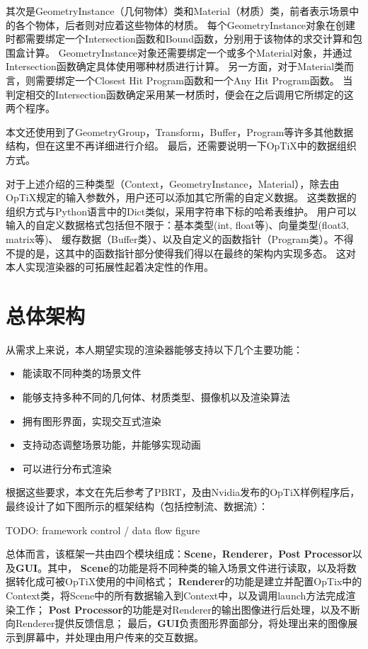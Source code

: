 其次是GeometryInstance（几何物体）类和Material（材质）类，前者表示场景中的各个物体，后者则对应着这些物体的材质。
每个GeometryInstance对象在创建时都需要绑定一个Intersection函数和Bound函数，分别用于该物体的求交计算和包围盒计算。
GeometryInstance对象还需要绑定一个或多个Material对象，并通过Intersection函数确定具体使用哪种材质进行计算。
另一方面，对于Material类而言，则需要绑定一个Closest Hit Program函数和一个Any Hit Program函数。
当判定相交的Intersection函数确定采用某一材质时，便会在之后调用它所绑定的这两个程序。

本文还使用到了GeometryGroup，Transform，Buffer，Program等许多其他数据结构，但在这里不再详细进行介绍。
最后，还需要说明一下OpTiX中的数据组织方式。

对于上述介绍的三种类型（Context，GeometryInstance，Material），除去由OpTiX规定的输入参数外，用户还可以添加其它所需的自定义数据。
这类数据的组织方式与Python语言中的Dict类似，采用字符串下标的哈希表维护。
用户可以输入的自定义数据格式包括但不限于：基本类型(int, float等)、向量类型(float3, matrix等)、
缓存数据（Buffer类）、以及自定义的函数指针（Program类）。不得不提的是，这其中的函数指针部分使得我们得以在最终的架构内实现多态。
这对本人实现渲染器的可拓展性起着决定性的作用。

\section{总体架构}
 
从需求上来说，本人期望实现的渲染器能够支持以下几个主要功能：

\begin{itemize}
    \item{能读取不同种类的场景文件}
    \item{能够支持多种不同的几何体、材质类型、摄像机以及渲染算法}
    \item{拥有图形界面，实现交互式渲染}
    \item{支持动态调整场景功能，并能够实现动画}
    \item{可以进行分布式渲染}
\end{itemize}

根据这些要求，本文在先后参考了PBRT\cite{PBRT}，及由Nvidia发布的OpTiX样例程序后，
最终设计了如下图所示的框架结构（包括控制流、数据流）：

TODO: framework control / data flow figure

总体而言，该框架一共由四个模块组成：\textbf{Scene}，\textbf{Renderer}，\textbf{Post Processor}以及\textbf{GUI}。其中，
\textbf{Scene}的功能是将不同种类的输入场景文件进行读取，以及将数据转化成可被OpTiX使用的中间格式；
\textbf{Renderer}的功能是建立并配置OpTix中的Context类，将Scene中的所有数据输入到Context中，以及调用launch方法完成渲染工作；
\textbf{Post Processor}的功能是对Renderer的输出图像进行后处理，以及不断向Renderer提供反馈信息；
最后，\textbf{GUI}负责图形界面部分，将处理出来的图像展示到屏幕中，并处理由用户传来的交互数据。

